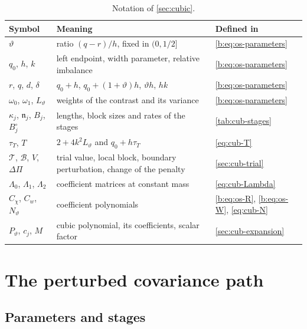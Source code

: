 \begin{table}[ht]
\centering
\small
\begin{tabular}{@{}lp{}l@{}}
\toprule
Symbol & Meaning & Defined in\\
\midrule
$\vartheta$ & ratio $(q-r)/h$, fixed in $(0,1/2]$ & \eqref{b:eq:os-parameters}\\
$q_0$, $h$, $k$ & left endpoint, width parameter, relative imbalance & \eqref{b:eq:os-parameters}\\
$r$, $q$, $d$, $\delta$ & $q_0+h$, $q_0+(1+\vartheta)h$, $\vartheta h$, $hk$ & \eqref{b:eq:os-parameters}\\
$\omega_0$, $\omega_1$, $L_\vartheta$ & weights of the contrast and its variance & \eqref{b:eq:os-parameters}\\
$\kappa_j$, $\mathfrak n_j$, $B_j$, $B_j^\circ$ & lengths, block sizes and rates of the stages & \cref{tab:cub-stages}\\
$\tau_T$, $T$ & $2+4k^2L_\vartheta$ and $q_0+h\tau_T$ & \eqref{eq:cub-T}\\
$\mathcal T$, $\mathcal B$, $V$, $\Delta\Pi$ & trial value, local block, boundary perturbation, change of the penalty & \cref{sec:cub-trial}\\
$\Lambda_0$, $\Lambda_1$, $\Lambda_2$ & coefficient matrices at constant mass & \eqref{eq:cub-Lambda}\\
$C_\chi$, $C_w$, $N_\vartheta$ & coefficient polynomials & \eqref{b:eq:os-R}, \eqref{b:eq:os-W}, \eqref{eq:cub-N}\\
$P_\vartheta$, $c_j$, $M$ & cubic polynomial, its coefficients, scalar factor & \cref{sec:cub-expansion}\\
\bottomrule
\end{tabular}
\caption{Notation of \cref{sec:cubic}.}\label{tab:cub-symbols}
\end{table}

\section{The perturbed covariance path}\label{sec:cub-path}

\subsection{Parameters and stages}

